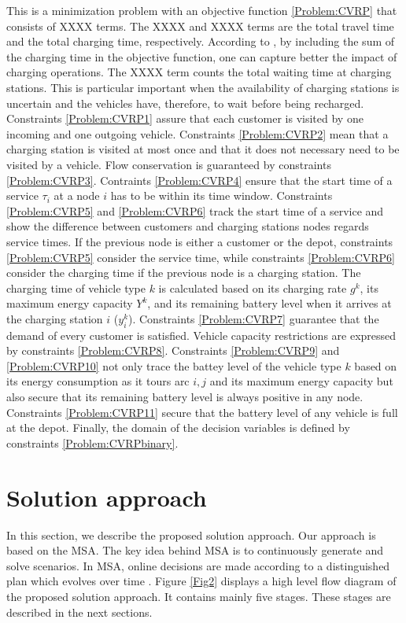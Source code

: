 \documentclass[11pt]{article}
\begin{document}
This is a minimization problem with an objective function \eqref{Problem:CVRP} that consists of XXXX terms. The XXXX and XXXX terms are the total travel time and the total charging time, respectively. According to \cite{Montoya2017}, by including the sum of the charging time in the objective function, one can capture better the impact of charging operations. The XXXX term counts the total waiting time at charging stations. This is particular important when the availability of charging stations is uncertain and the vehicles have, therefore, to wait before being recharged. Constraints \eqref{Problem:CVRP1} assure that each customer is visited by one incoming and one outgoing vehicle. Constraints \eqref{Problem:CVRP2} mean that a charging station is visited at most once and that it does not necessary need to be visited by a vehicle. Flow conservation is guaranteed by constraints \eqref{Problem:CVRP3}. Contraints \eqref{Problem:CVRP4} ensure that the start time of a service $\tau_i$ at a node $i$ has to be within its time window. Constraints \eqref{Problem:CVRP5} and \eqref{Problem:CVRP6} track the start time of a service and show the difference between customers and charging stations nodes regards service times. If the previous node is either a customer or the depot, constraints \eqref{Problem:CVRP5} consider the service time, while constraints \eqref{Problem:CVRP6} consider the charging time if the previous node is a charging station. The charging time of vehicle type $k$ is calculated based on its charging rate $g^k$, its maximum energy capacity $Y^k$, and its remaining battery level when it arrives at the charging station $i$ ($y^k_i$). Constraints \eqref{Problem:CVRP7} guarantee that the demand of every customer is satisfied. Vehicle capacity restrictions are expressed by constraints \eqref{Problem:CVRP8}. Constraints \eqref{Problem:CVRP9} and \eqref{Problem:CVRP10} not only trace the battey level of the vehicle type $k$ based on its energy consumption as it tours arc $i,j$ and its maximum energy capacity but also secure that its remaining battery level is always positive in any node. Constraints \eqref{Problem:CVRP11} secure that the battery level of any vehicle is full at the depot. Finally, the domain of the decision variables is defined by constraints \eqref{Problem:CVRPbinary}. 


\section{Solution approach}
\label{section:approach}
In this section, we describe the proposed solution approach. Our approach is based on the MSA. The key idea behind MSA is to continuously generate and solve scenarios. In MSA, online decisions are made according to a distinguished plan which evolves over time \citep{Bent2004}. Figure \ref{Fig2} displays a high level flow diagram of the proposed solution approach. It contains mainly five stages. These stages are described in the next sections.
\end{document}

